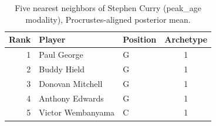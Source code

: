 \begin{table}[htbp]
  \centering\small
  \begin{tabular}{rllc}
    \toprule
    Rank & Player & Position & Archetype \\
    \midrule
    1 & Paul George & G & 1 \\
    2 & Buddy Hield & G & 1 \\
    3 & Donovan Mitchell & G & 1 \\
    4 & Anthony Edwards & G & 1 \\
    5 & Victor Wembanyama & C & 1 \\
    \bottomrule
  \end{tabular}
  \caption{Five nearest neighbors of Stephen Curry (peak_age modality), Procrustes-aligned posterior mean.}
  \label{tab:Stephen_Curry_neighbors_peak_age}
\end{table}

